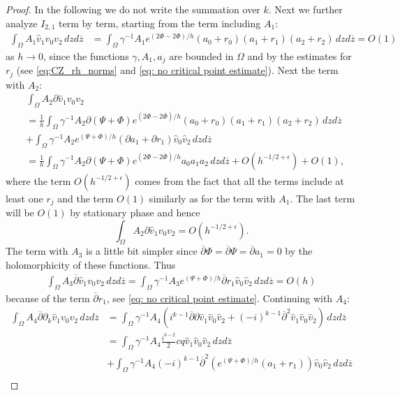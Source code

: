 \documentclass[a4paper, 10pt, twoside, notitlepage]{amsart}
\theoremstyle{plain}
\newcommand{\Om}{\Omega}
\numberwithin{equation}{section}
\newcommand {\p} {\partial}
\newcommand{\e}{\epsilon}
\newcommand{\dbar}{\ol{\p}}
\newcommand{\ol}[1]{\overline{#1}}
\newcommand{\oz}{\overline{z}}
\begin{document}
\begin{proof}
	In the following we do not write the summation over $k$. Next we further analyze $I_{2,1}$ term by term, starting from the term including $A_1$:
	\begin{align*}
		\int_{\Om}A_1\hat{v}_1v_0v_2\,dzd\oz &= \int_{\Om}\gamma^{-1}A_1e^{(2\Phi - 2\Phi)/h}(a_0 + r_0)(a_1 + r_1)(a_2 + r_2)\,dzd\oz = O(1)
	\end{align*}
	as $h\to0$, since the functions $\gamma, A_1, a_j$ are bounded in $\Om$ and by the estimates for $r_j$ (see \eqref{eq:CZ_rh_norms} and \eqref{eq: no critical point estimate}). Next the term with $A_2$:
	\begin{align*}
		&\int_{\Om}A_2\p \hat{v}_1v_0v_2\\
		&= \frac{1}{h}\int_{\Om}\gamma^{-1}A_2\p(\Psi + \Phi)e^{(2\Phi - 2\ol{\Phi})/h}(a_0 + r_0)(a_1 + r_1)(a_2 + r_2)\,dzd\oz \\
		&+ \int_{\Om}\gamma^{-1}A_2e^{(\Psi + \Phi)/h}(\p a_1 + \p r_1)\hat{v}_0\hat{v}_2\,dzd\oz\\
		&=\frac{1}{h}\int_{\Om}\gamma^{-1}A_2 \p(\Psi + \Phi)e^{(2\Phi - 2\ol{\Phi})/h}a_0a_1a_2\,dzd\oz + O(h^{-1/2+\e}) + O(1),
	\end{align*}
	where the term $O(h^{-1/2+\e})$ comes from the fact that all the terms include at least one $r_j$ and the term $O(1)$ similarly as for the term with $A_1$. The last term will be $O(1)$ by stationary phase and hence
	\begin{equation}\label{A_2}
		\int_{\Om}A_2\p \hat{v}_1v_0v_2 = O(h^{-1/2+\e}).
	\end{equation}
	The term with $A_3$ is a little bit simpler since $\dbar \Phi= \dbar\Psi = \dbar a_1=0$ by the holomorphicity of these functions. Thus
	\begin{align*}
		\int_{\Om} A_3\dbar \hat{v}_1v_0v_2\,dzd\oz = \int_{\Om}\gamma^{-1}A_3e^{(\Psi + \Phi)/h}\dbar r_1\hat{v}_0\hat{v}_2\,dzd\oz = O(h)
	\end{align*}
	because of the term $\dbar r_1$, see \eqref{eq: no critical point estimate}. Continuing with $A_4$:
	\begin{align*}
		\int_{\Om} A_4\dbar \p_k \hat{v}_1 v_0v_2\,dzd\oz &= \int_{\Om}\gamma^{-1}A_4\left(i^{k-1}\dbar\p \hat{v}_1\hat{v}_0\hat{v}_2 + (-i)^{k-1}\dbar^2 \hat{v}_1\hat{v}_0\hat{v}_2\right)\,dzd\oz\\
		&= \int_{\Om}\gamma^{-1}A_4\frac{i^{k-2}}{2}cq\hat{v}_1\hat{v}_0\hat{v}_2\,dzd\oz \\
		&+ \int_{\Om}\gamma^{-1}A_4(-i)^{k-1}\dbar^2\left(e^{(\Psi+\Phi)/h}(a_1+r_1)\right)\hat{v}_0\hat{v}_2\,dzd\oz\\

\end{align*}
\end{proof}
\end{document}
